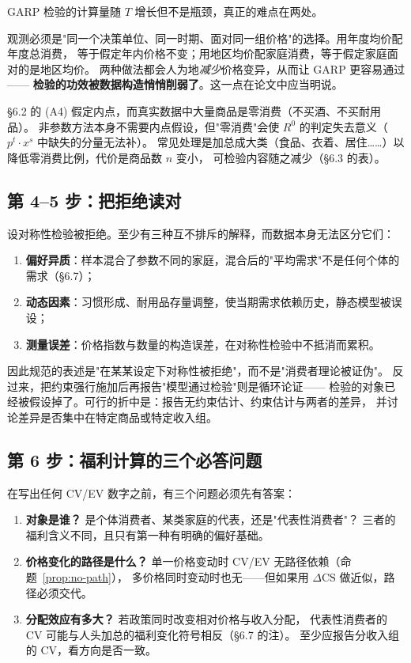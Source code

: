 GARP 检验的计算量随 $T$ 增长但不是瓶颈，真正的难点在两处。

观测必须是"同一个决策单位、同一时期、面对同一组价格"的选择。用年度均价配年度总消费，
等于假定年内价格不变；用地区均价配家庭消费，等于假定家庭面对的是地区均价。
两种做法都会人为地\emph{减少}价格变异，从而让 GARP 更容易通过——
\textbf{检验的功效被数据构造悄悄削弱了}。这一点在论文中应当明说。

\S 6.2 的 (A4) 假定内点，而真实数据中大量商品是零消费（不买酒、不买耐用品）。
非参数方法本身不需要内点假设，但"零消费"会使 $R^0$ 的判定失去意义（$p^t\cdot x^s$ 中缺失的分量无法补）。
常见处理是加总成大类（食品、衣着、居住……）以降低零消费比例，代价是商品数 $n$ 变小，
可检验内容随之减少（\S 6.3 的表）。

\subsection{第 4--5 步：把拒绝读对}

\begin{remark}
设对称性检验被拒绝。至少有三种互不排斥的解释，而数据本身无法区分它们：
\begin{enumerate}
\item \textbf{偏好异质}：样本混合了参数不同的家庭，混合后的"平均需求"不是任何个体的需求（\S 6.7）；
\item \textbf{动态因素}：习惯形成、耐用品存量调整，使当期需求依赖历史，静态模型被误设；
\item \textbf{测量误差}：价格指数与数量的构造误差，在对称性检验中不抵消而累积。
\end{enumerate}
因此规范的表述是"在某某设定下对称性被拒绝"，而不是"消费者理论被证伪"。
反过来，把约束强行施加后再报告"模型通过检验"则是循环论证——
检验的对象已经被假设掉了。可行的折中是：报告无约束估计、约束估计与两者的差异，
并讨论差异是否集中在特定商品或特定收入组。
\end{remark}

\subsection{第 6 步：福利计算的三个必答问题}

在写出任何 CV/EV 数字之前，有三个问题必须先有答案：

\begin{enumerate}
\item \textbf{对象是谁？} 是个体消费者、某类家庭的代表，还是"代表性消费者"？
      三者的福利含义不同，且只有第一种有明确的偏好基础。
\item \textbf{价格变化的路径是什么？} 单一价格变动时 CV/EV 无路径依赖（命题~\ref{prop:no-path}），
      多价格同时变动时也无——但如果用 $\Delta\mathrm{CS}$ 做近似，路径必须交代。
\item \textbf{分配效应有多大？} 若政策同时改变相对价格与收入分配，
      代表性消费者的 CV 可能与人头加总的福利变化符号相反（\S 6.7 的注）。
      至少应报告分收入组的 CV，看方向是否一致。
\end{enumerate}

